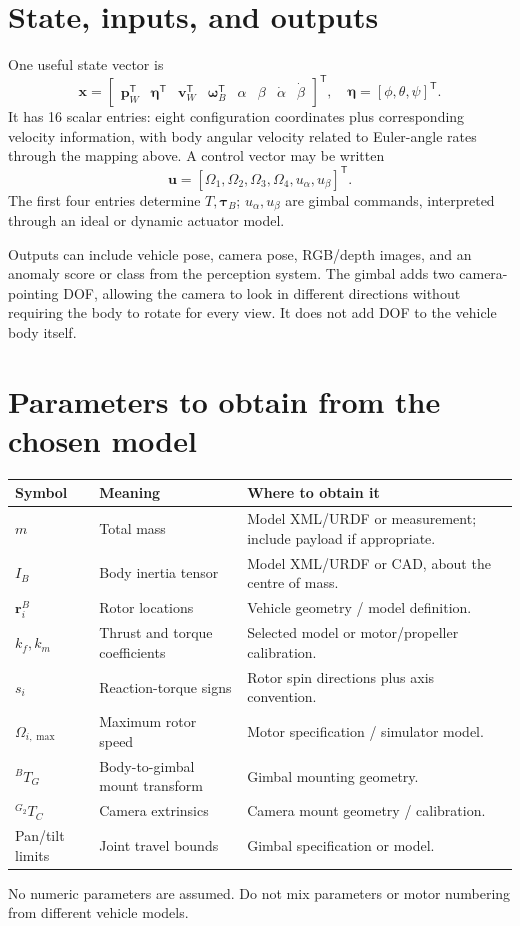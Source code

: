 \documentclass[11pt,a4paper]{article}
\begin{document}
\section{State, inputs, and outputs}
One useful state vector is
\[
\mathbf x=\begin{bmatrix}
\mathbf p_W^{\mathsf T}&\boldsymbol\eta^{\mathsf T}&
\mathbf v_W^{\mathsf T}&\boldsymbol\omega_B^{\mathsf T}&
\alpha&\beta&\dot\alpha&\dot\beta
\end{bmatrix}^{\mathsf T},
\quad \boldsymbol\eta=[\phi,\theta,\psi]^{\mathsf T}.
\]
It has 16 scalar entries: eight configuration coordinates plus corresponding velocity information, with body angular velocity related to Euler-angle rates through the mapping above. A control vector may be written
\[
\mathbf u=[\Omega_1,\Omega_2,\Omega_3,\Omega_4,u_\alpha,u_\beta]^{\mathsf T}.
\]
The first four entries determine \(T,\boldsymbol\tau_B\); \(u_\alpha,u_\beta\) are gimbal commands, interpreted through an ideal or dynamic actuator model.

Outputs can include vehicle pose, camera pose, RGB/depth images, and an anomaly score or class from the perception system. The gimbal adds two camera-pointing DOF, allowing the camera to look in different directions without requiring the body to rotate for every view. It does not add DOF to the vehicle body itself.

\section{Parameters to obtain from the chosen model}
\begin{center}
\begin{tabularx}{\textwidth}{>{\raggedright\arraybackslash}p{} >{\raggedright\arraybackslash}p{} X}
\toprule
Symbol & Meaning & Where to obtain it\\
\midrule
\(m\) & Total mass & Model XML/URDF or measurement; include payload if appropriate.\\
\(I_B\) & Body inertia tensor & Model XML/URDF or CAD, about the centre of mass.\\
\(\mathbf r_i^B\) & Rotor locations & Vehicle geometry / model definition.\\
\(k_f,k_m\) & Thrust and torque coefficients & Selected model or motor/propeller calibration.\\
\(s_i\) & Reaction-torque signs & Rotor spin directions plus axis convention.\\
\(\Omega_{i,\max}\) & Maximum rotor speed & Motor specification / simulator model.\\
\({}^BT_G\) & Body-to-gimbal mount transform & Gimbal mounting geometry.\\
\({}^{G_2}T_C\) & Camera extrinsics & Camera mount geometry / calibration.\\
Pan/tilt limits & Joint travel bounds & Gimbal specification or model.\\
\bottomrule
\end{tabularx}
\end{center}
No numeric parameters are assumed. Do not mix parameters or motor numbering from different vehicle models.
\end{document}
